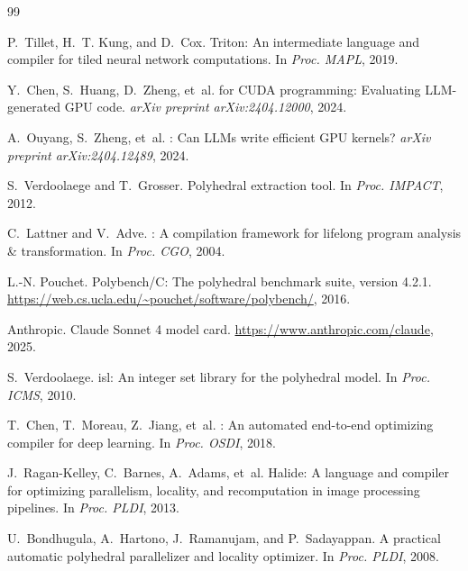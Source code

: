 \documentclass[sigconf]{acmart}
\begin{document}

\begin{thebibliography}{99}

P.~Tillet, H.~T. Kung, and D.~Cox.
\newblock Triton: An intermediate language and compiler for tiled neural
  network computations.
\newblock In \emph{Proc. MAPL}, 2019.

Y.~Chen, S.~Huang, D.~Zheng, et~al.
 for {CUDA} programming: Evaluating {LLM}-generated {GPU}
  code.
\newblock \emph{arXiv preprint arXiv:2404.12000}, 2024.

A.~Ouyang, S.~Zheng, et~al.
: Can {LLMs} write efficient {GPU} kernels?
\newblock \emph{arXiv preprint arXiv:2404.12489}, 2024.

S.~Verdoolaege and T.~Grosser.
\newblock Polyhedral extraction tool.
\newblock In \emph{Proc. IMPACT}, 2012.

C.~Lattner and V.~Adve.
: A compilation framework for lifelong program analysis \&
  transformation.
\newblock In \emph{Proc. CGO}, 2004.

L.-N. Pouchet.
\newblock Polybench/C: The polyhedral benchmark suite, version 4.2.1.
\newblock \url{https://web.cs.ucla.edu/~pouchet/software/polybench/}, 2016.

Anthropic.
\newblock Claude {Sonnet} 4 model card.
\newblock \url{https://www.anthropic.com/claude}, 2025.

S.~Verdoolaege.
\newblock isl: An integer set library for the polyhedral model.
\newblock In \emph{Proc. ICMS}, 2010.

T.~Chen, T.~Moreau, Z.~Jiang, et~al.
: An automated end-to-end optimizing compiler for deep
  learning.
\newblock In \emph{Proc. OSDI}, 2018.

J.~Ragan-Kelley, C.~Barnes, A.~Adams, et~al.
\newblock Halide: A language and compiler for optimizing parallelism,
  locality, and recomputation in image processing pipelines.
\newblock In \emph{Proc. PLDI}, 2013.

U.~Bondhugula, A.~Hartono, J.~Ramanujam, and P.~Sadayappan.
\newblock A practical automatic polyhedral parallelizer and locality
  optimizer.
\newblock In \emph{Proc. PLDI}, 2008.


\end{thebibliography}
\end{document}
